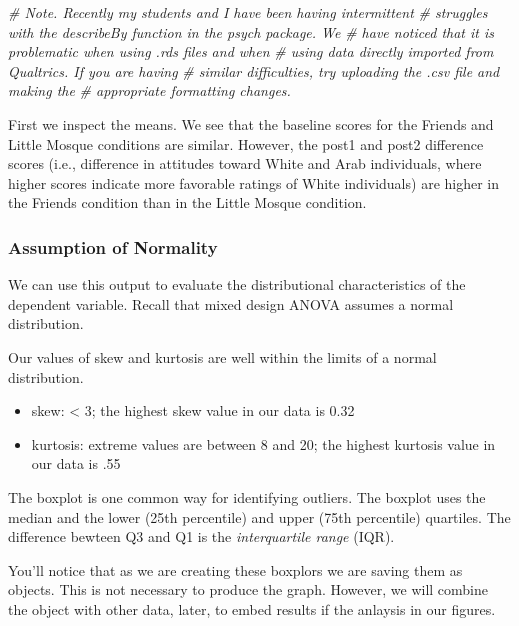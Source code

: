\documentclass[
  11pt,
]{book}
\newenvironment{Shaded}{\begin{snugshade}}{\end{snugshade}}
\newcommand{\CommentTok}[1]{\textcolor[rgb]{0.56,0.35,0.01}{\textit{#1}}}
\providecommand{\tightlist}{%
  \setlength{\itemsep}{0pt}\setlength{\parskip}{0pt}}
\begin{document}
\begin{Shaded}
\begin{Highlighting}[]
\CommentTok{\# Note. Recently my students and I have been having intermittent}
\CommentTok{\# struggles with the describeBy function in the psych package. We}
\CommentTok{\# have noticed that it is problematic when using .rds files and when}
\CommentTok{\# using data directly imported from Qualtrics. If you are having}
\CommentTok{\# similar difficulties, try uploading the .csv file and making the}
\CommentTok{\# appropriate formatting changes.}
\end{Highlighting}
\end{Shaded}

First we inspect the means. We see that the baseline scores for the Friends and Little Mosque conditions are similar. However, the post1 and post2 difference scores (i.e., difference in attitudes toward White and Arab individuals, where higher scores indicate more favorable ratings of White individuals) are higher in the Friends condition than in the Little Mosque condition.

\hypertarget{assumption-of-normality}{%
\subsubsection{Assumption of Normality}\label{assumption-of-normality}}

We can use this output to evaluate the distributional characteristics of the dependent variable. Recall that mixed design ANOVA assumes a normal distribution.

Our values of skew and kurtosis are well within the limits \citep{kline_principles_2016} of a normal distribution.

\begin{itemize}
\tightlist
\item
  skew: \textless{} 3; the highest skew value in our data is 0.32
\item
  kurtosis: extreme values are between 8 and 20; the highest kurtosis value in our data is .55
\end{itemize}

The boxplot is one common way for identifying outliers. The boxplot uses the median and the lower (25th percentile) and upper (75th percentile) quartiles. The difference bewteen Q3 and Q1 is the \emph{interquartile range} (IQR).

You'll notice that as we are creating these boxplors we are saving them as objects. This is not necessary to produce the graph. However, we will combine the object with other data, later, to embed results if the anlaysis in our figures.
\end{document}
